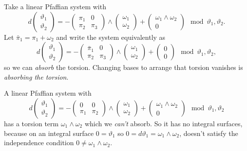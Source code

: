 \begin{example}
Take a linear Pfaffian system with
\[
d
\begin{pmatrix}
\vartheta_1 \\
\vartheta_2 
\end{pmatrix}
=
-
\begin{pmatrix}
\pi_1 & 0 \\
\pi_2 & \pi_3 
\end{pmatrix}
\wedge
\begin{pmatrix}
\omega_1 \\
\omega_2
\end{pmatrix}
+
\begin{pmatrix}
\omega_1 \wedge \omega_2 \\
0
\end{pmatrix}
\mod{\vartheta_1, \vartheta_2}.
\]
Let \(\bar\pi_1 = \pi_1 + \omega_2\) and write the system equivalently as
\[
d
\begin{pmatrix}
\vartheta_1 \\
\vartheta_2 
\end{pmatrix}
=
-
\begin{pmatrix}
\bar\pi_1 & 0 \\
\pi_2 & \pi_3 
\end{pmatrix}
\wedge
\begin{pmatrix}
\omega_1 \\
\omega_2
\end{pmatrix}
+
\begin{pmatrix}
0 \\
0
\end{pmatrix}
\mod{\vartheta_1, \vartheta_2},
\]
so we can \emph{absorb} the torsion.
Changing bases to arrange that torsion vanishes is \emph{absorbing the torsion}.
\end{example}
\begin{example}
A linear Pfaffian system with
\[
d
\begin{pmatrix}
\vartheta_1 \\
\vartheta_2 
\end{pmatrix}
=
-
\begin{pmatrix}
0 & 0 \\
\pi_1 & \pi_2 
\end{pmatrix}
\wedge
\begin{pmatrix}
\omega_1 \\
\omega_2
\end{pmatrix}
+
\begin{pmatrix}
\omega_1 \wedge \omega_2 \\
0
\end{pmatrix}
\mod{\vartheta_1, \vartheta_2}
\]
has a torsion term \(\omega_1 \wedge \omega_2\) which we \emph{can't} absorb.
So it has no integral surfaces, because on an integral surface \(0=\vartheta_1\) so \(0=d \vartheta_1=\omega_1 \wedge \omega_2\), doesn't satisfy the independence condition \(0 \ne \omega_1 \wedge \omega_2\).
\end{example}




